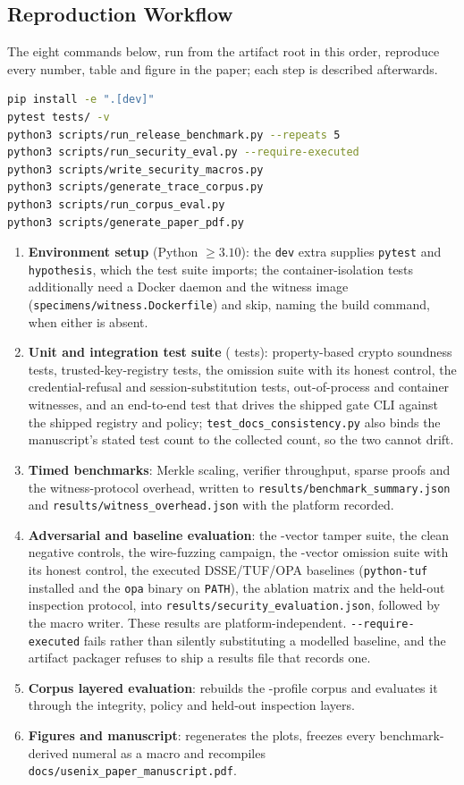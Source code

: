 \documentclass[letterpaper,10pt,twocolumn]{article}
\theoremstyle{definition}
\begin{document}
\subsection{Reproduction Workflow}
The eight commands below, run from the artifact root in this order, reproduce every number, table and figure in the paper; each step is described afterwards.
\begin{lstlisting}[language=bash,caption={Reproduction commands, in order.},label={lst:repro}]
pip install -e ".[dev]"
pytest tests/ -v
python3 scripts/run_release_benchmark.py --repeats 5
python3 scripts/run_security_eval.py --require-executed
python3 scripts/write_security_macros.py
python3 scripts/generate_trace_corpus.py
python3 scripts/run_corpus_eval.py
python3 scripts/generate_paper_pdf.py
\end{lstlisting}
\begin{enumerate}
    \item \textbf{Environment setup} (Python $\ge 3.10$): the \texttt{dev} extra supplies \texttt{pytest} and \texttt{hypothesis}, which the test suite imports; the container-isolation tests additionally need a Docker daemon and the witness image (\nolinkurl{specimens/witness.Dockerfile}) and skip, naming the build command, when either is absent.
    \item \textbf{Unit and integration test suite} (\testCount{} tests): property-based crypto soundness tests, trusted-key-registry tests, the omission suite with its honest control, the credential-refusal and session-substitution tests, out-of-process and container witnesses, and an end-to-end test that drives the shipped gate CLI against the shipped registry and policy; \nolinkurl{test_docs_consistency.py} also binds the manuscript's stated test count to the collected count, so the two cannot drift.
    \item \textbf{Timed benchmarks}: Merkle scaling, verifier throughput, sparse proofs and the witness-protocol overhead, written to \nolinkurl{results/benchmark_summary.json} and \nolinkurl{results/witness_overhead.json} with the platform recorded.
    \item \textbf{Adversarial and baseline evaluation}: the \scoredVectors{}-vector tamper suite, the clean negative controls, the wire-fuzzing campaign, the \omVectors{}-vector omission suite with its honest control, the executed DSSE/TUF/OPA baselines (\texttt{python-tuf} installed and the \texttt{opa} binary on \texttt{PATH}), the ablation matrix and the held-out inspection protocol, into \nolinkurl{results/security_evaluation.json}, followed by the macro writer. These results are platform-independent. \texttt{{-}{-}require-executed} fails rather than silently substituting a modelled baseline, and the artifact packager refuses to ship a results file that records one.
    \item \textbf{Corpus layered evaluation}: rebuilds the \corpusProfiles{}-profile corpus and evaluates it through the integrity, policy and held-out inspection layers.
    \item \textbf{Figures and manuscript}: regenerates the plots, freezes every benchmark-derived numeral as a macro and recompiles \nolinkurl{docs/usenix_paper_manuscript.pdf}.
\end{enumerate}
\end{document}
